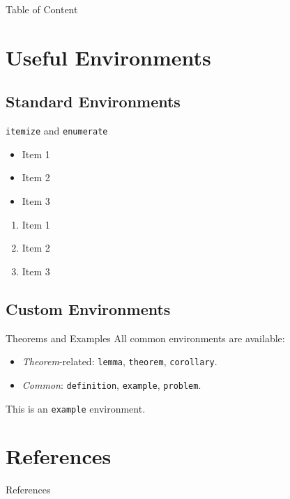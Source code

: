 \begin{frame}
    \titlepage
\end{frame}

\begin{frame}{Table of Content}
    \tableofcontents[hideallsubsections]
\end{frame}


\section{Useful Environments}
\subsection{Standard Environments}
\begin{frame}{\texttt{itemize} and \texttt{enumerate}}
    \begin{itemize}
        \item Item 1
        \item Item 2
        \item Item 3
    \end{itemize}

    \begin{enumerate}
        \item Item 1
        \item Item 2
        \item Item 3
    \end{enumerate}
\end{frame}

\subsection{Custom Environments}

\begin{frame}{Theorems and Examples}
    All common environments are available:
    \begin{itemize}
        \item \emph{Theorem}-related: \texttt{lemma}, \texttt{theorem}, \texttt{corollary}.
        \item \emph{Common}: \texttt{definition}, \texttt{example}, \texttt{problem}.
    \end{itemize}

    \begin{example}[A demonstration]
        This is an \texttt{example} environment.
    \end{example}
\end{frame}

\section{References}

\begin{frame}{References}
    \printbibliography
\end{frame}
